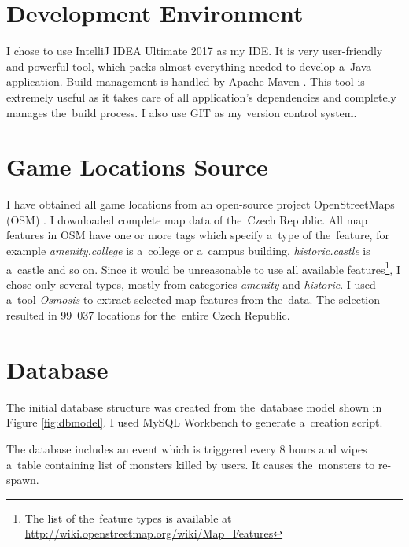 \section{Development Environment}
I chose to use IntelliJ IDEA Ultimate 2017 \cite{idea} as my IDE. It is very user-friendly and powerful tool, which packs almost everything needed to develop a~Java application. Build management is handled by Apache Maven \cite{maven}. This tool is extremely useful as it takes care of all application's dependencies and completely manages the~build process. I also use GIT \cite{git} as my version control system. 

\section{Game Locations Source}
I have obtained all game locations from an open-source project OpenStreetMaps (OSM) \cite{osm}. I downloaded complete map data of the~Czech Republic. All map features in OSM have one or more tags which specify a~type of the~feature, for example \textit{amenity.college} is a~college or a~campus building, \textit{historic.castle} is a~castle and so on. Since it would be unreasonable to use all available features\footnote{The list of the~feature types is available at \url{http://wiki.openstreetmap.org/wiki/Map_Features}}, I chose only several types, mostly from categories \textit{amenity} and \textit{historic}. I used a~tool \textit{Osmosis} \cite{osmosis} to extract selected map features from the~data. The selection resulted in 99~037 locations for the~entire Czech Republic.

\section{Database}
The initial database structure was created from the~database model shown in Figure \ref{fig:dbmodel}. I used MySQL Workbench \cite{mysqlworkbench} to generate a~creation script.

The database includes an event which is triggered every 8 hours and wipes a~table containing list of monsters killed by users. It causes the~monsters to re-spawn.  

